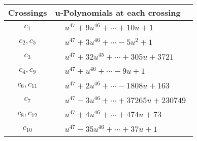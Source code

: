 \documentclass[1p]{elsarticle_modified}
\theoremstyle{definition}
\begin{document}
\begin{tabular}{m{50pt}|m{274pt}}
Crossings & \hspace{64pt}u-Polynomials at each crossing \\
\hline $$\begin{aligned}c_{1}\end{aligned}$$&$\begin{aligned}
&u^{47}+9 u^{46}+\cdots+10 u+1
\end{aligned}$\\
\hline $$\begin{aligned}c_{2},c_{5}\end{aligned}$$&$\begin{aligned}
&u^{47}+3 u^{46}+\cdots-5 u^2+1
\end{aligned}$\\
\hline $$\begin{aligned}c_{3}\end{aligned}$$&$\begin{aligned}
&u^{47}+32 u^{45}+\cdots+305 u+3721
\end{aligned}$\\
\hline $$\begin{aligned}c_{4},c_{9}\end{aligned}$$&$\begin{aligned}
&u^{47}+u^{46}+\cdots-9 u+1
\end{aligned}$\\
\hline $$\begin{aligned}c_{6},c_{11}\end{aligned}$$&$\begin{aligned}
&u^{47}+2 u^{46}+\cdots-1808 u+163
\end{aligned}$\\
\hline $$\begin{aligned}c_{7}\end{aligned}$$&$\begin{aligned}
&u^{47}-3 u^{46}+\cdots+37265 u+230749
\end{aligned}$\\
\hline $$\begin{aligned}c_{8},c_{12}\end{aligned}$$&$\begin{aligned}
&u^{47}+4 u^{46}+\cdots+474 u+73
\end{aligned}$\\
\hline $$\begin{aligned}c_{10}\end{aligned}$$&$\begin{aligned}
&u^{47}-35 u^{46}+\cdots+37 u+1
\end{aligned}$\\
\hline
\end{tabular}\\~\\
\end{document}
